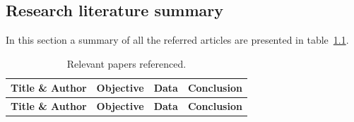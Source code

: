 \begin{landscape}
	\chapter{Research literature summary}
In this section a summary of all the referred articles are presented in table~\ref{my-label}.

	\hskip-5.0cm 
	\begin{longtable}[c]{|p{4cm}|p{6cm}|p{4cm}|p{6cm}|}
				\caption{Relevant papers referenced.\label{my-label}}\\
		\hline
				\rowcolor[HTML]{000000} 
				{\color[HTML]{FFFFFF} \textbf{Title \& Author}} & {\color[HTML]{FFFFFF} \textbf{Objective}} & {\color[HTML]{FFFFFF} \textbf{Data}} & {\color[HTML]{FFFFFF} \textbf{Conclusion}} \\ \hline
		\endfirsthead
		
		\hline
				\rowcolor[HTML]{000000} 
				{\color[HTML]{FFFFFF} \textbf{Title \& Author}} & {\color[HTML]{FFFFFF} \textbf{Objective}} & {\color[HTML]{FFFFFF} \textbf{Data}} & {\color[HTML]{FFFFFF} \textbf{Conclusion}} \\ \hline
		\hline
		\endhead
		
		

\end{longtable}
\end{landscape}
